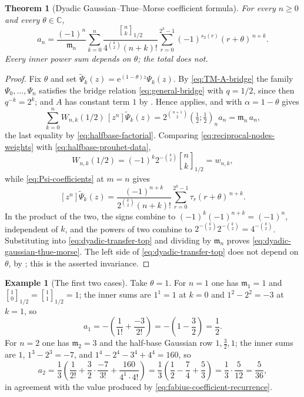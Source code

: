\documentclass[11pt,oneside,openany]{book}
\newtheorem{theorem}{Theorem}[chapter]
\theoremstyle{definition}
\newtheorem{example}[example]{Example}
\theoremstyle{remark}
\newcommand{\Qbinom}[3]{\genfrac{[}{]}{0pt}{}{#1}{#2}_{#3}}
\newcommand{\C}{\mathbb C}
\newcommand{\e}{\mathrm e}
\begin{document}
\begin{theorem}[Dyadic Gaussian--Thue--Morse coefficient formula]\label{thm:dyadic-gaussian-thue-morse}
For every $n\ge0$ and every $\theta\in\C$,
\begin{equation}\label{eq:dyadic-gaussian-thue-morse}
 \boxed{\;
 a_n=\frac{(-1)^n}{\mathfrak m_n}
 \sum_{k=0}^{n}
 \frac{\Qbinom nk{1/2}}{4^{\binom k2}(n+k)!}
 \sum_{r=0}^{2^k-1}(-1)^{s_2(r)}(r+\theta)^{\,n+k}.\;}
\end{equation}
Every inner power sum depends on $\theta$; the total does not.
\end{theorem}

\begin{proof}
Fix $\theta$ and set $\widetilde\Psi_k(z)=\e^{(1-\theta)z}\Psi_k(z)$.  By \eqref{eq:TM-A-bridge} the family $\Psi_0,\ldots,\Psi_n$ satisfies the bridge relation \eqref{eq:general-bridge} with $q=1/2$, since then $q^{-k}=2^k$; and $A$ has constant term $1$ by .  Hence  applies, and  with $\alpha=1-\theta$ gives
\begin{equation}\label{eq:dyadic-transfer-top}
 \sum_{k=0}^{n}W_{n,k}(1/2)\,[z^n]\widetilde\Psi_k(z)
 =2^{\binom{n+1}{2}}\left(\tfrac12;\tfrac12\right)_n a_n
 =\mathfrak m_n\,a_n,
\end{equation}
the last equality by \eqref{eq:halfbase-factorial}.  Comparing \eqref{eq:reciprocal-nodes-weights} with \eqref{eq:halfbase-prouhet-data},
\[
 W_{n,k}(1/2)=(-1)^k2^{-\binom k2}\Qbinom nk{1/2}=w_{n,k},
\]
while \eqref{eq:Psi-coefficients} at $m=n$ gives
\[
 [z^n]\widetilde\Psi_k(z)
 =\frac{(-1)^{n+k}}{2^{\binom k2}(n+k)!}
  \sum_{r=0}^{2^k-1}\tau_r(r+\theta)^{\,n+k}.
\]
In the product of the two, the signs combine to $(-1)^k(-1)^{n+k}=(-1)^n$, independent of $k$, and the powers of two combine to $2^{-\binom k2}2^{-\binom k2}=4^{-\binom k2}$.  Substituting into \eqref{eq:dyadic-transfer-top} and dividing by $\mathfrak m_n$ proves \eqref{eq:dyadic-gaussian-thue-morse}.  The left side of \eqref{eq:dyadic-transfer-top} does not depend on $\theta$, by ; this is the asserted invariance.
\end{proof}

\begin{example}[The first two cases]\label{ex:dyadic-formula-small}
Take $\theta=1$.  For $n=1$ one has $\mathfrak m_1=1$ and $\Qbinom 10{1/2}=\Qbinom 11{1/2}=1$; the inner sums are $1^1=1$ at $k=0$ and $1^2-2^2=-3$ at $k=1$, so
\[
 a_1=-\left(\frac{1}{1!}+\frac{-3}{2!}\right)=-\left(1-\frac32\right)=\frac12 .
\]
For $n=2$ one has $\mathfrak m_2=3$ and the half-base Gaussian row $1,\tfrac32,1$; the inner sums are $1$, $1^3-2^3=-7$, and $1^4-2^4-3^4+4^4=160$, so
\[
 a_2=\frac13\left(\frac{1}{2!}+\frac{3}{2}\cdot\frac{-7}{3!}
      +\frac{160}{4^1\cdot4!}\right)
    =\frac13\left(\frac12-\frac74+\frac53\right)
    =\frac13\cdot\frac5{12}=\frac5{36},
\]
in agreement with the value produced by \eqref{eq:fabius-coefficient-recurrence}.
\end{example}
\end{document}
